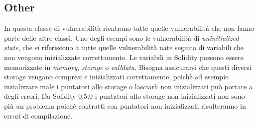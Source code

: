 \documentclass[../../Thesis.tex]{subfiles}
\begin{document}
\subsection{Other}
In questa classe di vulnerabilità rientrano tutte quelle vulnerabilità che non fanno parte delle altre classi. Uno degli esempi sono le vulnerabilità di \emph{uninitialized-state}, che si riferiscono a tutte quelle vulnerabilità nate seguito di variabili che non vengono inizializzate correttamente. Le variabili in Solidity possono essere memorizzate in \emph{memory}, \emph{storage} o \emph{calldata}. Bisogna assicurarsi che questi diversi storage vengano compresi e inizializzati correttamente, poichè ad esempio inzializzare male i puntatori allo storage o lasciarli non inizializzati può portare a degli errori. Da Solidity 0.5.0 i puntatori allo storage non inizializzati non sono più un problema poichè contratti con puntatori non inizializzati risulteranno in errori di compilazione.  
\end{document}
